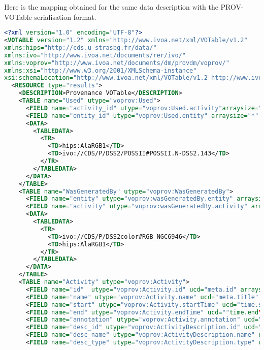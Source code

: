 Here is the mapping obtained for the same data description with the PROV-VOTable serialisation format.

\begin{lstlisting}[language=XML, caption= PROV-VOTable serialisation example for a color composition activity]
<?xml version="1.0" encoding="UTF-8"?>
<VOTABLE version="1.2" xmlns="http://www.ivoa.net/xml/VOTable/v1.2" 
xmlns:hips="http://cds.u-strasbg.fr/data/" 
xmlns:ivo="http://www.ivoa.net/documents/rer/ivo/" 
xmlns:voprov="http://www.ivoa.net/documents/dm/provdm/voprov/" 
xmlns:xsi="http://www.w3.org/2001/XMLSchema-instance" 
xsi:schemaLocation="http://www.ivoa.net/xml/VOTable/v1.2 http://www.ivoa.net/xml/VOTable/VOTable-1.2.xsd">
  <RESOURCE type="results">
    <DESCRIPTION>Provenance VOTable</DESCRIPTION>
    <TABLE name="Used" utype="voprov:Used">
      <FIELD name="activity_id" utype="voprov:Used.activity"arraysize="*" ucd="meta.id" datatype="char" />
      <FIELD name="entity_id" utype="voprov:Used.entity" arraysize="*" ucd="meta.id" datatype="char" />
      <DATA>
        <TABLEDATA>
          <TR>
            <TD>hips:AlaRGB1</TD>
            <TD>ivo://CDS/P/DSS2/POSSII#POSSII.N-DSS2.143</TD>
          </TR>
        </TABLEDATA>
      </DATA>
    </TABLE>
    <TABLE name="WasGeneratedBy" utype="voprov:WasGeneratedBy">
      <FIELD name="entity" utype="voprov:wasGeneratedBy.entity" arraysize="*" datatype="char"  ucd="meta.id"/>
      <FIELD name="activity" utype="voprov:wasGeneratedBy.activity" arraysize="*" datatype="char" ucd="meta.id"/>
      <DATA>
        <TABLEDATA>
          <TR>
            <TD>ivo://CDS/P/DSS2color#RGB_NGC6946</TD>
            <TD>hips:AlaRGB1</TD>
          </TR>
        </TABLEDATA>
      </DATA>
    </TABLE>
    <TABLE name="Activity" utype="voprov:Activity">
      <FIELD name="id"  utype="voprov:Activity.id" ucd="meta.id" arraysize="*" datatype="char" />
      <FIELD name="name" utype="voprov:Activity.name" ucd="meta.title" arraysize="*" datatype="char" />
      <FIELD name="start" utype="voprov:Activity.startTime" ucd="time.start" arraysize="*" datatype="char" />
      <FIELD name="end" utype="voprov:Activity.endTime" ucd=""time.end" arraysize="*" datatype="char"  "/>
      <FIELD name="annotation" utype="voprov:Activity.annotation" ucd="meta.description" arraysize="*" datatype="char" />
      <FIELD name="desc_id" utype="voprov:ActivityDescription.id" ucd="meta.id" arraysize="*" datatype="char" />
      <FIELD name="desc_name" utype="voprov:ActivityDescription.name" ucd="meta.title" arraysize="*" datatype="char" />
      <FIELD name="desc_type" utype="voprov:ActivityDescription.type" ucd="meta.code.class" arraysize="*" datatype="char" />

\end{lstlisting}
